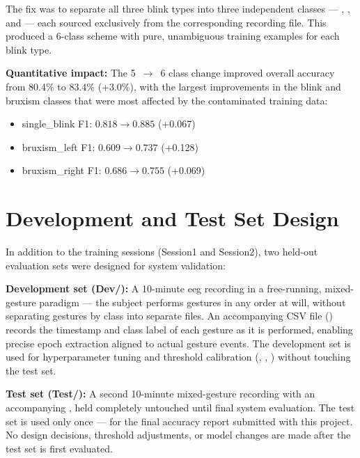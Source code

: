 The fix was to separate all three blink types into three
independent classes --- ,
, and  --- each sourced
exclusively from the corresponding recording file. This produced
a 6-class scheme with pure, unambiguous training examples for
each blink type.

\textbf{Quantitative impact:} The 5~$\rightarrow$~6 class
change improved overall accuracy from 80.4\% to 83.4\%
(+3.0\%), with the largest improvements in the blink and
bruxism classes that were most affected by the contaminated
training data:

\begin{itemize}[leftmargin=*]
    \item single\_blink F1: $0.818 \rightarrow 0.885$ (+0.067)
    \item bruxism\_left F1: $0.609 \rightarrow 0.737$ (+0.128)
    \item bruxism\_right F1: $0.686 \rightarrow 0.755$ (+0.069)
\end{itemize}

\section{Development and Test Set Design}
\label{sec:dc_devtest}

In addition to the training sessions (Session1 and Session2),
two held-out evaluation sets were designed for system validation:

\textbf{Development set (Dev/):} A 10-minute \acrshort{eeg}
recording in a free-running, mixed-gesture paradigm --- the
subject performs gestures in any order at will, without
separating gestures by class into separate files. An
accompanying CSV file () records the timestamp
and class label of each gesture as it is performed, enabling
precise epoch extraction aligned to actual gesture events. The
development set is used for hyperparameter tuning and threshold
calibration (, ,
) without touching the test set.

\textbf{Test set (Test/):} A second 10-minute mixed-gesture
recording with an accompanying , held
completely untouched until final system evaluation. The test
set is used only once --- for the final accuracy report
submitted with this project. No design decisions, threshold
adjustments, or model changes are made after the test set is
first evaluated.


